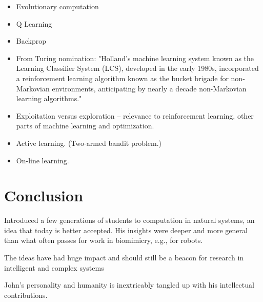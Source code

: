 \documentclass{sig-alternate}
\begin{document}
\begin{itemize}
\item Evolutionary computation
\item Q Learning
\item Backprop
\item    From Turing nomination: "Holland's machine learning system known as the
   Learning Classifier System (LCS), developed in the early 1980s,
   incorporated a reinforcement learning algorithm known as the bucket
   brigade for non-Markovian environments, anticipating by nearly a
   decade non-Markovian learning algorithms."
\item Exploitation versus exploration -- relevance to reinforcement
  learning, other parts of machine learning and optimization.
\item Active learning.  (Two-armed bandit problem.) 
\item On-line learning.  
\end{itemize}

\section{Conclusion}

Introduced a few generations of students to computation in natural systems, an idea that today is better accepted.  His insights were deeper and more general than what often passes for work in biomimicry, e.g., for robots.

The ideas have had huge impact and should still be a beacon for research in intelligent and complex systems

John's personality and humanity is inextricably tangled up with his intellectual contributions.




\end{document}
